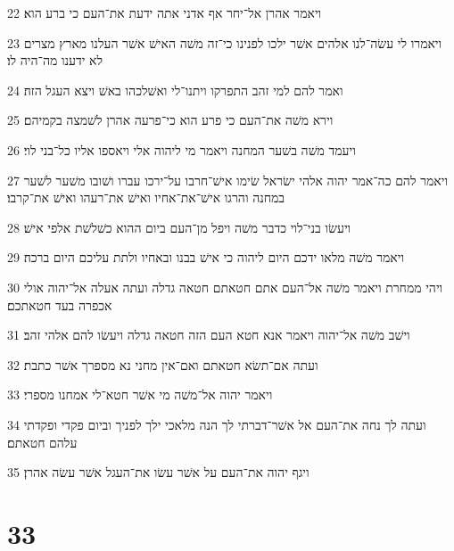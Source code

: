 \par 22 ויאמר אהרן אל־יחר אף אדני אתה ידעת את־העם כי ברע הוא׃
\par 23 ויאמרו לי עשׂה־לנו אלהים אשׁר ילכו לפנינו כי־זה משׁה האישׁ אשׁר העלנו מארץ מצרים לא ידענו מה־היה לו׃
\par 24 ואמר להם למי זהב התפרקו ויתנו־לי ואשׁלכהו באשׁ ויצא העגל הזה׃
\par 25 וירא משׁה את־העם כי פרע הוא כי־פרעה אהרן לשׁמצה בקמיהם׃
\par 26 ויעמד משׁה בשׁער המחנה ויאמר מי ליהוה אלי ויאספו אליו כל־בני לוי׃
\par 27 ויאמר להם כה־אמר יהוה אלהי ישׂראל שׂימו אישׁ־חרבו על־ירכו עברו ושׁובו משׁער לשׁער במחנה והרגו אישׁ־את־אחיו ואישׁ את־רעהו ואישׁ את־קרבו׃
\par 28 ויעשׂו בני־לוי כדבר משׁה ויפל מן־העם ביום ההוא כשׁלשׁת אלפי אישׁ׃
\par 29 ויאמר משׁה מלאו ידכם היום ליהוה כי אישׁ בבנו ובאחיו ולתת עליכם היום ברכה׃
\par 30 ויהי ממחרת ויאמר משׁה אל־העם אתם חטאתם חטאה גדלה ועתה אעלה אל־יהוה אולי אכפרה בעד חטאתכם׃
\par 31 וישׁב משׁה אל־יהוה ויאמר אנא חטא העם הזה חטאה גדלה ויעשׂו להם אלהי זהב׃
\par 32 ועתה אם־תשׂא חטאתם ואם־אין מחני נא מספרך אשׁר כתבת׃
\par 33 ויאמר יהוה אל־משׁה מי אשׁר חטא־לי אמחנו מספרי׃
\par 34 ועתה לך נחה את־העם אל אשׁר־דברתי לך הנה מלאכי ילך לפניך וביום פקדי ופקדתי עלהם חטאתם׃
\par 35 ויגף יהוה את־העם על אשׁר עשׂו את־העגל אשׁר עשׂה אהרן׃

\chapter{33}

